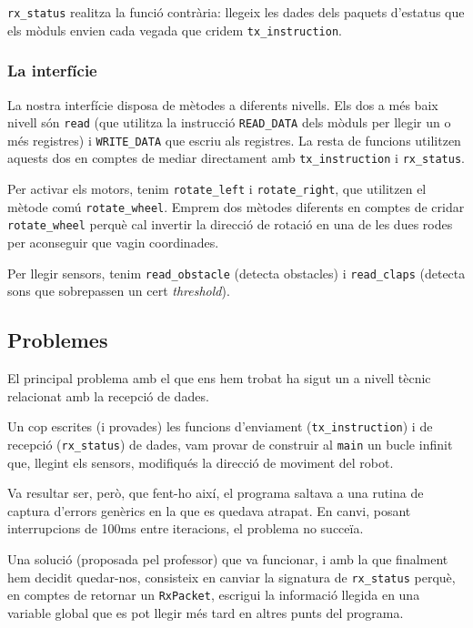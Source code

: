 \documentclass{../pdae} %
\begin{document}
\texttt{rx\_status} realitza la funció contrària: llegeix les dades dels
paquets d'estatus que els mòduls envien cada vegada que cridem
\texttt{tx\_instruction}.



\subsubsection{La interfície}

La nostra interfície disposa de mètodes a diferents nivells. Els dos a més baix
nivell són \texttt{read} (que utilitza la instrucció \texttt{READ\_DATA} dels
mòduls per llegir un o més registres) i \texttt{WRITE\_DATA} que escriu als
registres. La resta de funcions utilitzen aquests dos en comptes de mediar
directament amb \texttt{tx\_instruction} i \texttt{rx\_status}.

Per activar els motors, tenim \texttt{rotate\_left} i \texttt{rotate\_right},
que utilitzen el mètode comú \texttt{rotate\_wheel}. Emprem dos mètodes
diferents en comptes de cridar \texttt{rotate\_wheel} perquè cal invertir la
direcció de rotació en una de les dues rodes per aconseguir que vagin
coordinades.

Per llegir sensors, tenim \texttt{read\_obstacle} (detecta obstacles) i
\texttt{read\_claps} (detecta sons que sobrepassen un cert \textit{threshold}).



\subsection{Problemes}

El principal problema amb el que ens hem trobat ha sigut un a nivell tècnic
relacionat amb la recepció de dades.

Un cop escrites (i provades) les funcions d'enviament (\texttt{tx\_instruction})
i de recepció (\texttt{rx\_status}) de dades, vam provar de construir al
\texttt{main} un bucle infinit que, llegint els sensors, modifiqués la
direcció de moviment del robot.

Va resultar ser, però, que fent-ho així, el programa saltava a una rutina
de captura d'errors genèrics en la que es quedava atrapat. En canvi, posant
interrupcions de 100ms entre iteracions, el problema no succeïa.

Una solució (proposada pel professor) que va funcionar, i amb la que finalment
hem decidit quedar-nos, consisteix en canviar la signatura de
\texttt{rx\_status} perquè, en comptes de retornar un \texttt{RxPacket},
escrigui la informació llegida en una variable global que es pot llegir més
tard en altres punts del programa.
\end{document}
